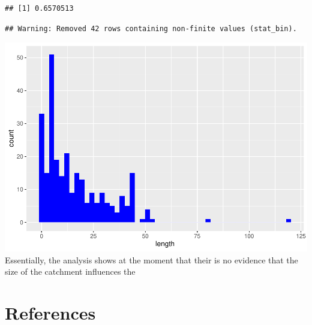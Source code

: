 \documentclass[]{elsarticle} %
\newenvironment{Shaded}{\begin{snugshade}}{\end{snugshade}}
\newcommand{\DataTypeTok}[1]{\textcolor[rgb]{0.13,0.29,0.53}{#1}}
\newcommand{\DecValTok}[1]{\textcolor[rgb]{0.00,0.00,0.81}{#1}}
\newcommand{\KeywordTok}[1]{\textcolor[rgb]{0.13,0.29,0.53}{\textbf{#1}}}
\newcommand{\NormalTok}[1]{#1}
\newcommand{\OperatorTok}[1]{\textcolor[rgb]{0.81,0.36,0.00}{\textbf{#1}}}
\newcommand{\StringTok}[1]{\textcolor[rgb]{0.31,0.60,0.02}{#1}}
\begin{document}
\begin{Shaded}
\end{Shaded}

\begin{verbatim}
## [1] 0.6570513
\end{verbatim}

\begin{Shaded}
\end{Shaded}

\begin{verbatim}
## Warning: Removed 42 rows containing non-finite values (stat_bin).
\end{verbatim}

\includegraphics{Forest_and_Water_files/figure-latex/unnamed-chunk-22-1.pdf}
Essentially, the analysis shows at the moment that their is no evidence
that the size of the catchment influences the

\hypertarget{references}{%
\section*{References}\label{references}}
\end{document}
